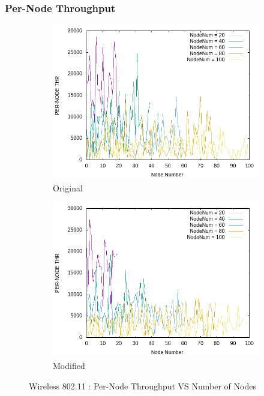 \newpage
\subsubsection{Per-Node Throughput}
    \begin{figure}[!h] 
    	\centering
    	
    	\begin{subfigure}{0.9\textwidth} %
    		\includegraphics[width=.9\textwidth]{Pictures/Wireless802.11Mobile/Original/PER-NODETHRVSNodeNum.png}
    		 \caption{Original} %
    	\end{subfigure}
    	
    	\vspace{1em} %
    	
    	\begin{subfigure}{0.9\textwidth} %
    		\includegraphics[width=.9\textwidth]{Pictures/Wireless802.11Mobile/Modified/PER-NODETHRVSNodeNum.png}
    		 \caption{ Modified} %
    	\end{subfigure}
    	
    	 \caption{Wireless 802.11 : Per-Node Throughput VS Number of Nodes} %
    \end{figure}
    
